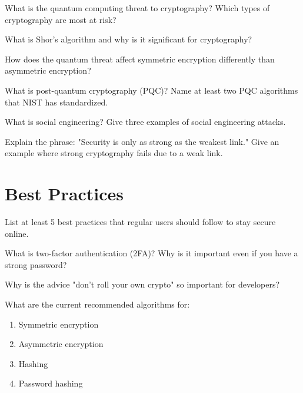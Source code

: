 \documentclass[11pt,a4paper]{report}
\begin{document}
\begin{ex}
What is the quantum computing threat to cryptography? Which types of cryptography are most at risk?
\end{ex}

\begin{ex}
What is Shor's algorithm and why is it significant for cryptography?
\end{ex}

\begin{ex}
How does the quantum threat affect symmetric encryption differently than asymmetric encryption?
\end{ex}

\begin{ex}
What is post-quantum cryptography (PQC)? Name at least two PQC algorithms that NIST has standardized.
\end{ex}

\begin{ex}
What is social engineering? Give three examples of social engineering attacks.
\end{ex}

\begin{ex}
Explain the phrase: "Security is only as strong as the weakest link." Give an example where strong cryptography fails due to a weak link.
\end{ex}

\section{Best Practices}

\begin{ex}
List at least 5 best practices that regular users should follow to stay secure online.
\end{ex}

\begin{ex}
What is two-factor authentication (2FA)? Why is it important even if you have a strong password?
\end{ex}

\begin{ex}
Why is the advice "don't roll your own crypto" so important for developers?
\end{ex}

\begin{ex}
What are the current recommended algorithms for:
\begin{enumerate}[label=\alph*)]
    \item Symmetric encryption
    \item Asymmetric encryption
    \item Hashing
    \item Password hashing
\end{enumerate}
\end{ex}
\end{document}

